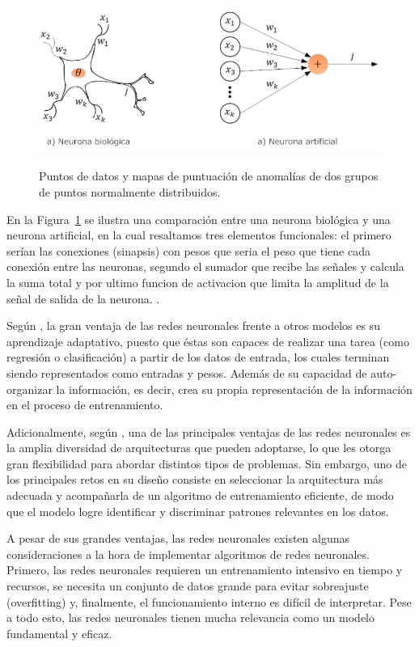 \documentclass[11pt,a4paper,spanish]{book}
\numberwithin{equation}{chapter}
\numberwithin{figure}{chapter}
\begin{document}
\begin{figure}[h]
    \caption{Puntos de datos y mapas de puntuación de anomalías de dos grupos de puntos 
    normalmente distribuidos.  \protect\cite{fernandez2013redes} }
    \centering
    \includegraphics[width=1.0\textwidth]{media/neuona-artificial.png}
    \label{fig:figNauronaArtificial}
\end{figure}


En la Figura~\ref{fig:figNauronaArtificial} se ilustra una comparación entre una neurona 
biológica y una neurona artificial, en la cual resaltamos tres elementos funcionales: 
el primero serían las conexiones (sinapsis) con pesos que seria el peso que tiene cada 
conexión entre las neuronas, segundo el sumador que recibe las señales y calcula la suma 
total y por ultimo funcion de activacion que limita la amplitud de la señal de salida de 
la neurona. \cite{fernandez2013redes}.


Según \cite{rivera2007redes}, la gran ventaja de las redes neuronales frente a otros 
modelos es su aprendizaje adaptativo, puesto que éstas son capaces de realizar una 
tarea (como regresión o clasificación) a partir de los datos de entrada, los cuales 
terminan siendo representados como entradas y pesos.  Además de su capacidad de 
auto-organizar la información, es decir, crea su propia representación de la 
información en el proceso de entrenamiento. 


Adicionalmente, según \cite{varela2011redes}, una de las principales ventajas de las 
redes neuronales es la amplia diversidad de arquitecturas que pueden adoptarse, lo que 
les otorga gran flexibilidad para abordar distintos tipos de problemas. Sin embargo, 
uno de los principales retos en su diseño consiste en seleccionar la arquitectura más 
adecuada y acompañarla de un algoritmo de entrenamiento eficiente, de modo que el modelo 
logre identificar y discriminar patrones relevantes en los datos. 


A pesar de sus grandes ventajas, las redes neuronales existen algunas consideraciones a 
la hora de implementar algoritmos de redes neuronales. Primero, las redes neuronales 
requieren un entrenamiento intensivo en tiempo y recursos, se necesita un conjunto de 
datos grande para evitar sobreajuste (overfitting) y, finalmente, el funcionamiento 
interno es difícil de interpretar. Pese a todo esto, las redes neuronales tienen mucha 
relevancia como un modelo fundamental y eficaz. \cite{larranaga2021redes}
\end{document}
